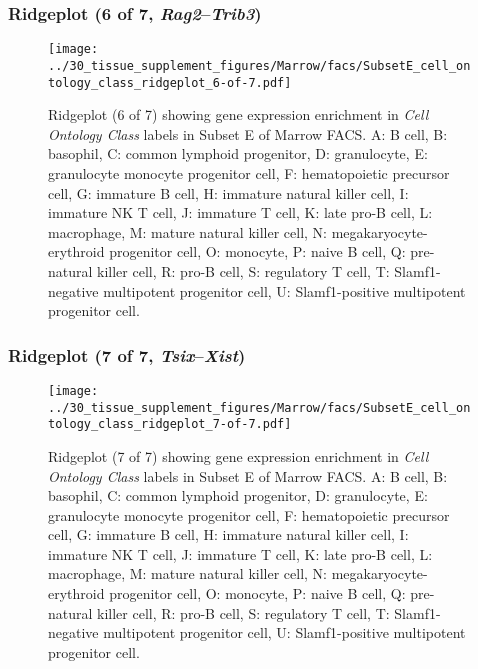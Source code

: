 \subsubsection{Ridgeplot (6 of 7, \emph{Rag2}--\emph{Trib3})}
\begin{figure}[h]
\centering
\texttt{[image: ../30\_tissue\_supplement\_figures/Marrow/facs/SubsetE\_cell\_ontology\_class\_ridgeplot\_6-of-7.pdf]}

\caption{ Ridgeplot (6 of 7)  showing gene expression enrichment in \emph{Cell Ontology Class} labels in Subset E of Marrow FACS. A: B cell, B: basophil, C: common lymphoid progenitor, D: granulocyte, E: granulocyte monocyte progenitor cell, F: hematopoietic precursor cell, G: immature B cell, H: immature natural killer cell, I: immature NK T cell, J: immature T cell, K: late pro-B cell, L: macrophage, M: mature natural killer cell, N: megakaryocyte-erythroid progenitor cell, O: monocyte, P: naive B cell, Q: pre-natural killer cell, R: pro-B cell, S: regulatory T cell, T: Slamf1-negative multipotent progenitor cell, U: Slamf1-positive multipotent progenitor cell.}
\end{figure}


\clearpage

\subsubsection{Ridgeplot (7 of 7, \emph{Tsix}--\emph{Xist})}
\begin{figure}[h]
\centering
\texttt{[image: ../30\_tissue\_supplement\_figures/Marrow/facs/SubsetE\_cell\_ontology\_class\_ridgeplot\_7-of-7.pdf]}

\caption{ Ridgeplot (7 of 7)  showing gene expression enrichment in \emph{Cell Ontology Class} labels in Subset E of Marrow FACS. A: B cell, B: basophil, C: common lymphoid progenitor, D: granulocyte, E: granulocyte monocyte progenitor cell, F: hematopoietic precursor cell, G: immature B cell, H: immature natural killer cell, I: immature NK T cell, J: immature T cell, K: late pro-B cell, L: macrophage, M: mature natural killer cell, N: megakaryocyte-erythroid progenitor cell, O: monocyte, P: naive B cell, Q: pre-natural killer cell, R: pro-B cell, S: regulatory T cell, T: Slamf1-negative multipotent progenitor cell, U: Slamf1-positive multipotent progenitor cell.}
\end{figure}


\clearpage


